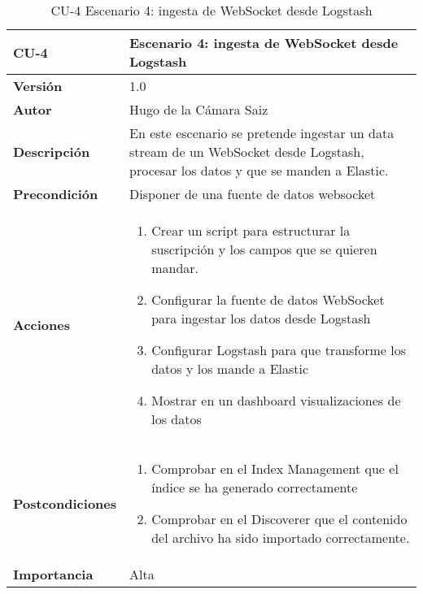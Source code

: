 \begin{table}[p]
	\centering
	\begin{tabularx}{\linewidth}{ p{} p{} }
		\toprule
		\textbf{CU-4}    & \textbf{Escenario 4: ingesta de WebSocket desde Logstash}\\
		\toprule
		\textbf{Versión}              & 1.0    \\
		\textbf{Autor}                & Hugo de la Cámara Saiz \\
		\textbf{Descripción}          & En este escenario se pretende ingestar un data stream de un WebSocket desde Logstash, procesar los datos y que se manden a Elastic. \\
		\textbf{Precondición}         & Disponer de una fuente de datos websocket \\
		\textbf{Acciones}             &
		\begin{enumerate}
			\def\labelenumi{\arabic{enumi}.}
			\tightlist
			\item Crear un script para estructurar la suscripción y los campos que se quieren mandar.
                \item Configurar la fuente de datos WebSocket para ingestar los datos desde Logstash
                \item Configurar Logstash para que transforme los datos y los mande a Elastic
                \item Mostrar en un dashboard visualizaciones de los datos
		\end{enumerate}\\
              \textbf{Postcondiciones}             &
		\begin{enumerate}
			\def\labelenumi{\arabic{enumi}.}
			\tightlist
			\item Comprobar en el Index Management que el índice se ha generado correctamente
			\item Comprobar en el Discoverer que el contenido del archivo ha sido importado correctamente.
		\end{enumerate}\\
		\textbf{Importancia}          & Alta \\
		\bottomrule
	\end{tabularx}
	\caption{CU-4 Escenario 4: ingesta de WebSocket desde Logstash}
\end{table}

